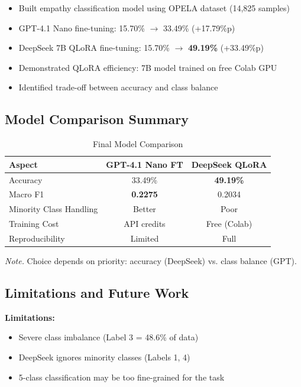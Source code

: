 \documentclass[11pt, a4paper]{article}
\begin{document}
\begin{itemize}
    \item Built empathy classification model using OPELA dataset (14,825 samples)
    \item GPT-4.1 Nano fine-tuning: 15.70\% $\rightarrow$ 33.49\% (+17.79\%p)
    \item DeepSeek 7B QLoRA fine-tuning: 15.70\% $\rightarrow$ \textbf{49.19\%} (+33.49\%p)
    \item Demonstrated QLoRA efficiency: 7B model trained on free Colab GPU
    \item Identified trade-off between accuracy and class balance
\end{itemize}

\subsection{Model Comparison Summary}

\begin{table}[H]
\centering
\caption{Final Model Comparison}
\label{tab:final_comparison}
\begin{tabular}{lcc}
\toprule
\textbf{Aspect} & \textbf{GPT-4.1 Nano FT} & \textbf{DeepSeek QLoRA} \\
\midrule
Accuracy & 33.49\% & \textbf{49.19\%} \\
Macro F1 & \textbf{0.2275} & 0.2034 \\
Minority Class Handling & Better & Poor \\
Training Cost & API credits & Free (Colab) \\
Reproducibility & Limited & Full \\
\bottomrule
\end{tabular}

\vspace{0.5em}
\footnotesize\textit{Note.} Choice depends on priority: accuracy (DeepSeek) vs. class balance (GPT).
\end{table}

\subsection{Limitations and Future Work}

\textbf{Limitations:}
\begin{itemize}
    \item Severe class imbalance (Label 3 = 48.6\% of data)
    \item DeepSeek ignores minority classes (Labels 1, 4)
    \item 5-class classification may be too fine-grained for the task
\end{itemize}
\end{document}
